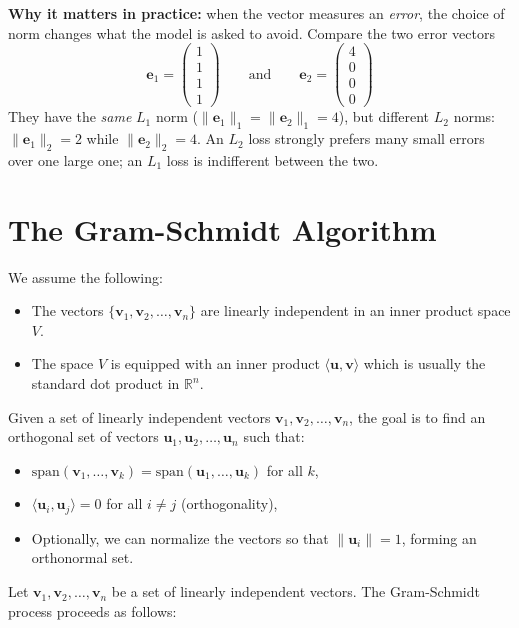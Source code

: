 \documentclass[]{article}
\begin{document}
	\noindent
	\textbf{Why it matters in practice:}
	when the vector measures an \textit{error}, the choice of norm changes what the model is asked to avoid.
	Compare the two error vectors
	$$
	\mathbf{e}_1 = \begin{pmatrix} 1 \\ 1 \\ 1 \\ 1 \end{pmatrix}
	\qquad \text{and} \qquad
	\mathbf{e}_2 = \begin{pmatrix} 4 \\ 0 \\ 0 \\ 0 \end{pmatrix}
	$$
	They have the \textit{same} $L_1$ norm ($\|\mathbf{e}_1\|_1 = \|\mathbf{e}_2\|_1 = 4$), but different $L_2$ norms: $\|\mathbf{e}_1\|_2 = 2$ while $\|\mathbf{e}_2\|_2 = 4$.
	An $L_2$ loss strongly prefers many small errors over one large one; an $L_1$ loss is indifferent between the two.
	
	
	
	\section{The Gram-Schmidt Algorithm}	
	We assume the following:
	\begin{itemize}
		\item The vectors $\{ \mathbf{v}_1, \mathbf{v}_2, \dots, \mathbf{v}_n \}$ are linearly independent in an inner product space $V$.
		\item The space $V$ is equipped with an inner product $\langle \mathbf{u}, \mathbf{v} \rangle$ which is usually the standard dot product in $\mathbb{R}^n$.
	\end{itemize}
	
	Given a set of linearly independent vectors $\mathbf{v}_1, \mathbf{v}_2, \dots, \mathbf{v}_n$, the goal is to find an orthogonal set of vectors $\mathbf{u}_1, \mathbf{u}_2, \dots, \mathbf{u}_n$ such that:
	\begin{itemize}
		\item $\text{span}(\mathbf{v}_1, \dots, \mathbf{v}_k) = \text{span}(\mathbf{u}_1, \dots, \mathbf{u}_k)$ for all $k$,
		\item $\langle \mathbf{u}_i, \mathbf{u}_j \rangle = 0$ for all $i \neq j$ (orthogonality),
		\item Optionally, we can normalize the vectors so that $\|\mathbf{u}_i\| = 1$, forming an orthonormal set.
	\end{itemize}
	Let $\mathbf{v}_1, \mathbf{v}_2, \dots, \mathbf{v}_n$ be a set of linearly independent vectors.
	The Gram-Schmidt process proceeds as follows:
	
\end{document}
